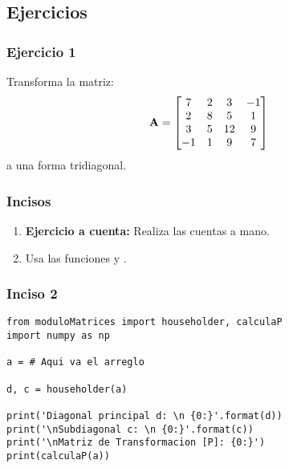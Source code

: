 \documentclass[12pt]{beamer}
\begin{document}
\subsection{Ejercicios}

\begin{frame}
\frametitle{Ejercicio 1}
Transforma la matriz:
\renewcommand{\arraystretch}{1}
\begin{align*}
\vb{A} =
\begin{bmatrix}
7 & 2 & 3 & -1 \\
2 & 8 & 5 & 1 \\
3 & 5 & 12 & 9 \\
-1 & 1 & 9 & 7 \\
\end{bmatrix}
\end{align*}
a una forma tridiagonal.
\end{frame}
\begin{frame}
\frametitle{Incisos}
\begin{enumerate}[<+->]
\item \textbf{Ejercicio a cuenta:} Realiza las cuentas a mano.
\item Usa las funciones  y .
\end{enumerate}
\end{frame}
\begin{frame}
\frametitle{Inciso 2}
\begin{lstlisting}[caption=Código para resolver el ejercicio]
from moduloMatrices import householder, calculaP
import numpy as np

a = # Aqui va el arreglo

d, c = householder(a)

print('Diagonal principal d: \n {0:}'.format(d))
print('\nSubdiagonal c: \n {0:}'.format(c))
print('\nMatriz de Transformacion [P]: {0:}')
print(calculaP(a))
\end{lstlisting}
\end{frame}
\end{document}
